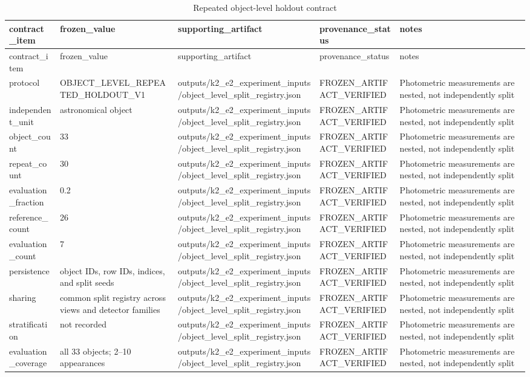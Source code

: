 \begin{longtable}{lllll}
\caption{Repeated object-level holdout contract}\\
\toprule
contract\_item & frozen\_value & supporting\_artifact & provenance\_status & notes \\
\midrule
\endfirsthead
\toprule
contract\_item & frozen\_value & supporting\_artifact & provenance\_status & notes \\
\midrule
\endhead
protocol & OBJECT\_LEVEL\_REPEATED\_HOLDOUT\_V1 & outputs/k2\_e2\_experiment\_inputs/object\_level\_split\_registry.json & FROZEN\_ARTIFACT\_VERIFIED & Photometric measurements are nested, not independently split \\
independent\_unit & astronomical object & outputs/k2\_e2\_experiment\_inputs/object\_level\_split\_registry.json & FROZEN\_ARTIFACT\_VERIFIED & Photometric measurements are nested, not independently split \\
object\_count & 33 & outputs/k2\_e2\_experiment\_inputs/object\_level\_split\_registry.json & FROZEN\_ARTIFACT\_VERIFIED & Photometric measurements are nested, not independently split \\
repeat\_count & 30 & outputs/k2\_e2\_experiment\_inputs/object\_level\_split\_registry.json & FROZEN\_ARTIFACT\_VERIFIED & Photometric measurements are nested, not independently split \\
evaluation\_fraction & 0.2 & outputs/k2\_e2\_experiment\_inputs/object\_level\_split\_registry.json & FROZEN\_ARTIFACT\_VERIFIED & Photometric measurements are nested, not independently split \\
reference\_count & 26 & outputs/k2\_e2\_experiment\_inputs/object\_level\_split\_registry.json & FROZEN\_ARTIFACT\_VERIFIED & Photometric measurements are nested, not independently split \\
evaluation\_count & 7 & outputs/k2\_e2\_experiment\_inputs/object\_level\_split\_registry.json & FROZEN\_ARTIFACT\_VERIFIED & Photometric measurements are nested, not independently split \\
persistence & object IDs, row IDs, indices, and split seeds & outputs/k2\_e2\_experiment\_inputs/object\_level\_split\_registry.json & FROZEN\_ARTIFACT\_VERIFIED & Photometric measurements are nested, not independently split \\
sharing & common split registry across views and detector families & outputs/k2\_e2\_experiment\_inputs/object\_level\_split\_registry.json & FROZEN\_ARTIFACT\_VERIFIED & Photometric measurements are nested, not independently split \\
stratification & not recorded & outputs/k2\_e2\_experiment\_inputs/object\_level\_split\_registry.json & FROZEN\_ARTIFACT\_VERIFIED & Photometric measurements are nested, not independently split \\
evaluation\_coverage & all 33 objects; 2–10 appearances & outputs/k2\_e2\_experiment\_inputs/object\_level\_split\_registry.json & FROZEN\_ARTIFACT\_VERIFIED & Photometric measurements are nested, not independently split \\
\bottomrule
\end{longtable}
